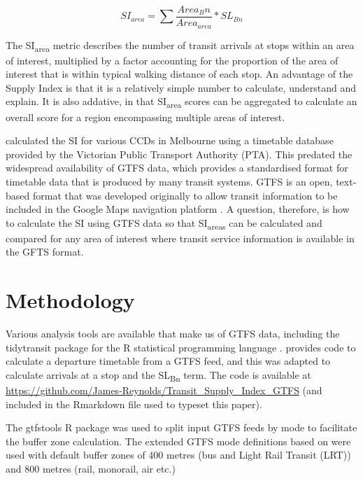 \documentclass[numbered]{trbunofficial}
\begin{document}
\begin{equation}
\label{eq:supply_index}
  SI_{area} = \sum{\frac{Area{_Bn}}{Area_{area}}*SL_{Bn}}
\end{equation}

The SI\textsubscript{area} metric describes the number of transit
arrivals at stops within an area of interest, multiplied by a factor
accounting for the proportion of the area of interest that is within
typical walking distance of each stop. An advantage of the Supply Index
is that it is a relatively simple number to calculate, understand and
explain. It is also addative, in that SI\textsubscript{area} scores can
be aggregated to calculate an overall score for a region encompassing
multiple areas of interest.

\citet{currie2007identifying} calculated the SI for various CCDs in
Melbourne using a timetable database provided by the Victorian Public
Transport Authority (PTA). This predated the widespread availability of
GTFS data, which provides a standardised format for timetable data that
is produced by many transit systems. GTFS is an open, text-based format
that was developed originally to allow transit information to be
included in the Google Maps navigation platform \citep{GTFS}. A
question, therefore, is how to calculate the SI using GTFS data so that
SI\textsubscript{areas} can be calculated and compared for any area of
interest where transit service information is available in the GFTS
format.

\hypertarget{methodology}{%
\section{Methodology}\label{methodology}}

Various analysis tools are available that make us of GTFS data,
including the tidytransit package \citep{tidytransit2023} for the R
statistical programming language \citep{R-base}.
\citet{tidytransit_departure_timetable} provides code to calculate a
departure timetable from a GTFS feed, and this was adapted to calculate
arrivals at a stop and the SL\textsubscript{Bn} term. The code is
available at
\url{https://github.com/James-Reynolds/Transit_Supply_Index_GTFS} (and
included in the Rmarkdown file used to typeset this paper).

The gtfstools R package \citep{R-gtfstools} was used to split input GTFS
feeds by mode to facilitate the buffer zone calculation. The extended
GTFS mode definitions based on \citet{filter_GTFS_by_mode} were used
with default buffer zones of 400 metres (bus and Light Rail Transit
(LRT)) and 800 metres (rail, monorail, air etc.)
\end{document}
